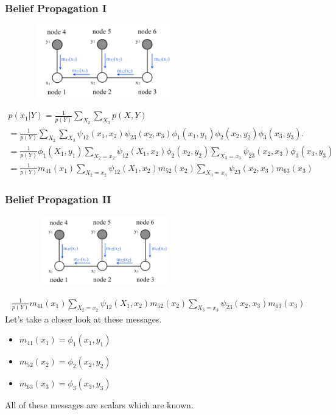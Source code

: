 \documentclass{beamer}
\begin{document}
\begin{frame}
\frametitle{Belief Propagation I}
\begin{figure}
	\begin{center}
		\includegraphics[width=6.5cm, height=3.15cm]{bp}
	\end{center}
\end{figure}
\begin{gather*}
p(x_1 | Y) = \frac{1}{p(Y)} \sum_{X_2} \sum_{X_3} p(X, Y)\\
= \frac{1}{p(Y)} \sum_{X_2} \sum_{X_3} \psi_{12}(x_1, x_2) \psi_{23}(x_2, x_3) \phi_1(x_1, y_1) \phi_2(x_2, y_2) \phi_3(x_3, y_3).\\
= \frac{1}{p(Y)} \phi_1(X_1, y_1) \sum_{X_2 = x_2} \psi_{12}(X_1, x_2) \phi_2(x_2, y_2) \sum_{X_3 = x_3} \psi_{23}(x_2, x_3) \phi_3(x_3, y_3)\\
= \frac{1}{p(Y)} m_{41}(x_1) \sum_{X_2 = x_2} \psi_{12}(X_1, x_2) m_{52}(x_2) \sum_{X_3 = x_3} \psi_{23}(x_2, x_3) m_{63}(x_3)
\end{gather*}
\end{frame}

\begin{frame}
\frametitle{Belief Propagation II}
\begin{figure}
	\begin{center}
		\includegraphics[width=6.5cm, height=3cm]{bp}
	\end{center}
\end{figure}
\begin{gather*}
\frac{1}{p(Y)} m_{41}(x_1) \sum_{X_2 = x_2} \psi_{12}(X_1, x_2) m_{52}(x_2) \sum_{X_3 = x_3} \psi_{23}(x_2, x_3) m_{63}(x_3)
\end{gather*}
Let's take a closer look at these messages.
\begin{itemize}
	\item $m_{41}(x_1) = \phi_1(x_1, y_1)$
	\item $m_{52}(x_2) = \phi_2(x_2, y_2)$
	\item $m_{63}(x_3) = \phi_3(x_3, y_3)$
\end{itemize}
All of these messages are scalars which are known.
\end{frame}
\end{document}
